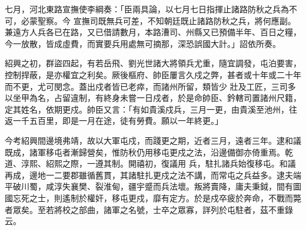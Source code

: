 \begin{pinyinscope}
 七月，河北東路宣撫使李綱奏：「臣兩具論，以七月七日指揮止諸路防秋之兵為不可，必蒙聖察。今
 宣撫司既無兵可差，不知朝廷既止諸路防秋之兵，將何應副。兼遠方人兵各已在路，又已借請數月，本路漕司、州縣又已預備半年、百日之糧，今一放散，皆成虛費，而實要兵用處無可摘那，深恐誤國大計。」詔依所奏。



 紹興之初，群盜四起，有若岳飛、劉光世諸大將領兵尤重，隨宜調發，屯泊要害，控制捍蔽，是亦權宜之利矣。厥後樞府、帥臣屢言久戍之弊，甚者或十年或二十年而不更，尤可閔念。蓋出戍者皆已老瘁，而諸州所留，類皆少
 壯及工匠，三司多以坐甲為名，占留違制，有終身未嘗一日戍者，於是命帥臣、鈐轄司置諸州尺籍，定其姓名，依期更戍。帥臣又言：「有如貴溪戍兵，三月一更，由貴溪至池州，往返一千五百里，即是一月在途，徒有勞費。願以一年終更。」



 今考紹興間邊境弗靖，故以大軍屯戍，而踐更之期，近者三月，遠者三年。逮和議既成，諸軍移屯者漸歸營矣，惟防秋仍用移屯更戍之法，沿邊備御亦倚重焉。乾道、淳熙、紹熙之際，一遵其制。開禧初，復議用
 兵，駐扎諸兵始復移屯。和議再成，邊地一二要郡雖循舊貫，其諸駐扎更戍之法不講，而常屯之兵益多。逮夫端平破川蜀，咸淳失襄樊、裂淮甸，疆宇蹙而兵法壞。叛將賣降，庸夫秉鉞，間有圖國忘死之士，則遙制於權奸，移屯更戍，靡有定方。於是戍卒疲於奔命，不戰而斃者眾矣。至若將校之部曲，諸軍之名號，士卒之眾寡，詳列於屯駐者，茲不重錄云。



\end{pinyinscope}